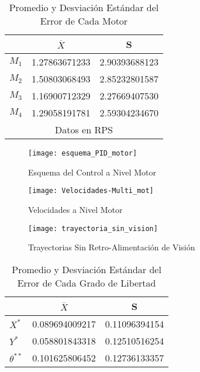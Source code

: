 {\begin{table}
\centering
\caption{Promedio y Desviación Estándar del Error de Cada Motor}
\begin{tabular}{l|c c }

     & \(\overline{X}\) & S  \\
\hline
\(M_1\)   & 1.27863671233 & 2.90393688123 \\
\(M_2\)   & 1.50803068493 & 2.85232801587 \\
\(M_3\)   & 1.16900712329 & 2.27669407530  \\
\(M_4\)   & 1.29058191781 & 2.59304234670  \\
\hline
\multicolumn{3}{c}{Datos en RPS}
\end{tabular}
\label{table:prom_std_vels_mots}
\end{table}

\begin{figure}
	\centering
		\texttt{[image: esquema\_PID\_motor]}
	\caption{Esquema del Control a Nivel Motor}
	\label{fig:esquema_niv_mot}
\end{figure}



\begin{figure}
	\centering
		\texttt{[image: Velocidades-Multi\_mot]}
	\caption{Velocidades a Nivel Motor}
	\label{fig:vels_niv_motor}
\end{figure}


\begin{figure}
	\centering
		\texttt{[image: trayectoria\_sin\_vision]}
	\caption{Trayectorias Sin Retro-Alimentación de Visión}
	\label{fig:tray_sin_vision}
\end{figure}


\begin{table}
\caption{Promedio y Desviación Estándar del Error de Cada Grado de Libertad}
\centering
\begin{tabular}{l|c c }

     & \(\overline{X}\) & S  \\
\hline
\(X^{*}\)    & 0.089694009217 & 0.11096394154  \\
\(Y^{*}\)    & 0.058801843318 & 0.12510516254  \\
\(\theta^{**}\)  & 0.101625806452 & 0.12736133357  \\


\end{tabular}
\end{table}}
